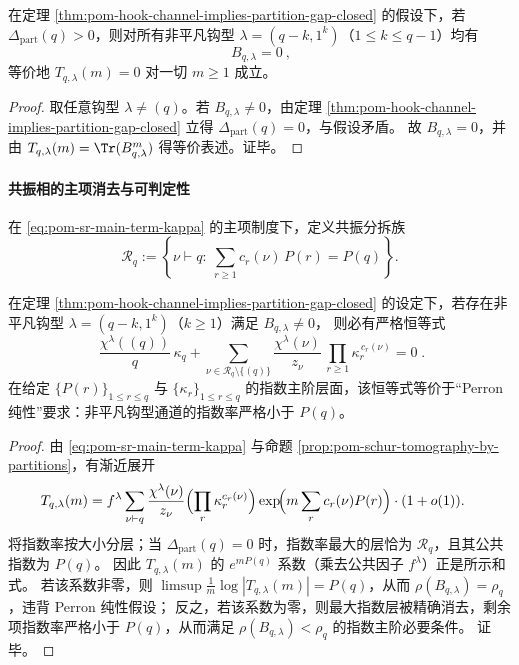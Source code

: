 \begin{theorem}[严格分拆间隙 \texorpdfstring{$\Rightarrow$}{=>} 钩型通道湮灭]\label{thm:pom-partition-gap-positive-kills-hooks}
在定理 \ref{thm:pom-hook-channel-implies-partition-gap-closed} 的假设下，若 \(\Delta_{\mathrm{part}}(q)>0\)，则对所有非平凡钩型 \(\lambda=(q-k,1^k)\)（\(1\le k\le q-1\)）均有
\[
\boxed{\ B_{q,\lambda}=0\ },
\]
等价地 \(T_{q,\lambda}(m)=0\) 对一切 \(m\ge 1\) 成立。
\end{theorem}
\begin{proof}
取任意钩型 \(\lambda\neq(q)\)。若 \(B_{q,\lambda}\neq 0\)，由定理 \ref{thm:pom-hook-channel-implies-partition-gap-closed} 立得 \(\Delta_{\mathrm{part}}(q)=0\)，与假设矛盾。
故 \(B_{q,\lambda}=0\)，并由 \(T_{q,\lambda}(m)=\Tr(B_{q,\lambda}^m)\) 得等价表述。证毕。
\end{proof}

\paragraph{共振相的主项消去与可判定性}
在 \eqref{eq:pom-sr-main-term-kappa} 的主项制度下，定义共振分拆族
\[
\mathcal{R}_q:=\left\{\nu\vdash q:\ \sum_{r\ge 1}c_r(\nu)\,P(r)=P(q)\right\}.
\]

\begin{theorem}[钩型通道主项消去的代数约束]\label{thm:pom-hook-channel-leading-term-cancellation}
在定理 \ref{thm:pom-hook-channel-implies-partition-gap-closed} 的设定下，若存在非平凡钩型 \(\lambda=(q-k,1^k)\)（\(k\ge 1\)）满足 \(B_{q,\lambda}\neq 0\)，
则必有严格恒等式
\[
\boxed{\;
\frac{\chi^\lambda((q))}{q}\,\kappa_q
+\sum_{\nu\in\mathcal{R}_q\setminus\{(q)\}}
\frac{\chi^\lambda(\nu)}{z_\nu}\,
\prod_{r\ge 1}\kappa_r^{\,c_r(\nu)}
=0\; }.
\]
在给定 \(\{P(r)\}_{1\le r\le q}\) 与 \(\{\kappa_r\}_{1\le r\le q}\) 的指数主阶层面，该恒等式等价于“Perron 纯性”要求：非平凡钩型通道的指数率严格小于 \(P(q)\)。
\end{theorem}
\begin{proof}
由 \eqref{eq:pom-sr-main-term-kappa} 与命题 \ref{prop:pom-schur-tomography-by-partitions}，有渐近展开
\[
\begin{aligned}
T_{q,\lambda}(m)
&=
f^\lambda\sum_{\nu\vdash q}\frac{\chi^\lambda(\nu)}{z_\nu}
\Bigl(\prod_r \kappa_r^{c_r(\nu)}\Bigr)
\exp\!\Bigl(m\sum_r c_r(\nu)P(r)\Bigr)\cdot(1+o(1)).
\end{aligned}
\]
将指数率按大小分层；当 \(\Delta_{\mathrm{part}}(q)=0\) 时，指数率最大的层恰为 \(\mathcal{R}_q\)，且其公共指数为 \(P(q)\)。
因此 \(T_{q,\lambda}(m)\) 的 \(e^{mP(q)}\) 系数（乘去公共因子 \(f^\lambda\)）正是所示和式。
若该系数非零，则 \(\limsup \frac1m\log|T_{q,\lambda}(m)|=P(q)\)，从而 \(\rho(B_{q,\lambda})=\rho_q\)，违背 Perron 纯性假设；
反之，若该系数为零，则最大指数层被精确消去，剩余项指数率严格小于 \(P(q)\)，从而满足 \(\rho(B_{q,\lambda})<\rho_q\) 的指数主阶必要条件。
证毕。
\end{proof}

